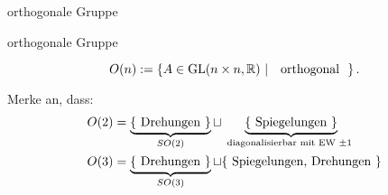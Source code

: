 \documentclass[class=article, crop=false]{standalone}
\begin{document}
\begin{zettel}{orthogonale Gruppe}
\begin{flashcard}[zs280vyr]{orthogonale Gruppe}
	\begin{definition}
		\[
			O (n):= \set{A \in  \GL(n \times n,\R )}{\tx{ orthogonal }}
		.\]
	\end{definition}
\end{flashcard}

Merke an, dass:
\begin{align*}
	O(2) & = \underbrace{\set{\tx{Drehungen}}}_{SO(2)} \sqcup \underbrace{\set{\tx{Spiegelungen}}}_\tx{diagonalisierbar mit EW $\pm 1$ } \\
	O(3) & = \underbrace{\set{\tx{Drehungen}}}_{SO(3)} \sqcup \set{\tx{Spiegelungen, Drehungen} }                                        \\
\end{align*}
\end{zettel}
\end{document}
